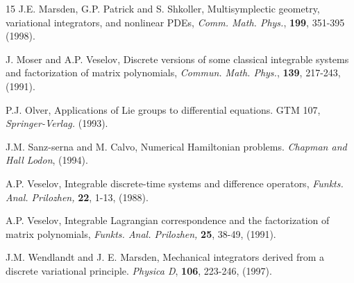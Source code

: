 \documentclass[a4paper,a4paper]{article}
\begin{document}
\begin{thebibliography} {15}
\label{m1}
J.E. Marsden, G.P. Patrick and S. Shkoller, Multisymplectic geometry,
variational integrators, and nonlinear PDEs, {\em Comm. Math. Phys.},
{\bf 199}, 351-395 (1998).


\label{m3}
J. Moser and A.P. Veselov, Discrete versions of some classical integrable systems
and factorization of matrix polynomials, {\em Commun. Math. Phys.}, {\bf 139},
217-243, (1991).

\label{o1}
 P.J. Olver, Applications of Lie groups to differential equations.
GTM 107, {\em Springer-Verlag.} (1993).

\label{s1}
J.M. Sanz-serna and M. Calvo, Numerical Hamiltonian problems. {\em
Chapman and Hall Lodon}, (1994).

\label{v1}
A.P. Veselov, Integrable discrete-time systems and difference operators, {\em
Funkts. Anal. Prilozhen,} {\bf 22}, 1-13, (1988).

\label{v2}
A.P. Veselov, Integrable Lagrangian correspondence and the factorization of
matrix polynomials,  {\em Funkts. Anal. Prilozhen,} {\bf 25}, 38-49, (1991).

\label{w1}
J.M. Wendlandt and J. E. Marsden, Mechanical integrators derived from a discrete
variational principle. {\em Physica D}, {\bf 106}, 223-246, (1997).



\end{thebibliography}
\end{document}
